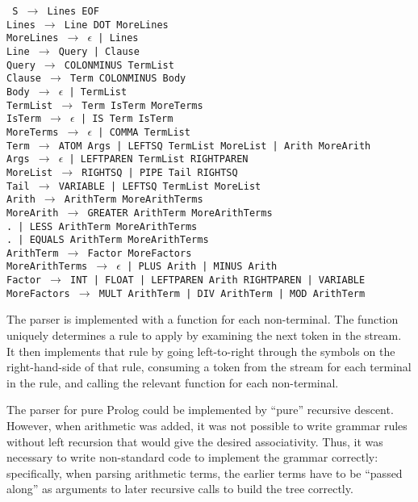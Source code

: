 \documentclass[12pt]{article}
\begin{document}
\texttt{
S $\rightarrow$ Lines EOF\\
Lines $\rightarrow$ Line DOT MoreLines\\
MoreLines $\rightarrow$ $\epsilon$ | Lines\\
Line $\rightarrow$ Query | Clause\\
Query $\rightarrow$ COLONMINUS TermList\\
Clause $\rightarrow$ Term COLONMINUS Body\\
Body $\rightarrow$ $\epsilon$ | TermList\\
TermList $\rightarrow$ Term IsTerm MoreTerms\\
IsTerm $\rightarrow$ $\epsilon$ | IS Term IsTerm\\
MoreTerms $\rightarrow$ $\epsilon$ | COMMA TermList\\
Term $\rightarrow$ ATOM Args | LEFTSQ TermList MoreList | Arith MoreArith\\
Args $\rightarrow$ $\epsilon$ | LEFTPAREN TermList RIGHTPAREN\\
MoreList $\rightarrow$ RIGHTSQ | PIPE Tail RIGHTSQ\\
Tail $\rightarrow$ VARIABLE | LEFTSQ TermList MoreList\\
Arith $\rightarrow$ ArithTerm MoreArithTerms\\
MoreArith $\rightarrow$ GREATER ArithTerm MoreArithTerms\\
.\hspace{50px} | LESS ArithTerm MoreArithTerms \\
.\hspace{50px} | EQUALS ArithTerm MoreArithTerms\\
ArithTerm $\rightarrow$ Factor MoreFactors\\
MoreArithTerms $\rightarrow$ $\epsilon$ | PLUS Arith | MINUS Arith\\
Factor $\rightarrow$ INT | FLOAT | LEFTPAREN Arith RIGHTPAREN | VARIABLE\\
MoreFactors $\rightarrow$ MULT ArithTerm | DIV ArithTerm | MOD ArithTerm
}

The parser is implemented with a function for each non-terminal. 
The function uniquely determines a rule to apply by examining the next token in the stream. 
It then implements that rule by going left-to-right through the symbols on the right-hand-side of that rule, consuming a token from the stream for each terminal in the rule, and calling the relevant function for each non-terminal.

The parser for pure Prolog could be implemented by ``pure'' recursive descent. 
However, when arithmetic was added, it was not possible to write grammar rules without left recursion that would give the desired associativity. 
Thus, it was necessary to write non-standard code to implement the grammar correctly: specifically, when parsing arithmetic terms, the earlier terms have to be ``passed along'' as arguments to later recursive calls to build the tree correctly.
\end{document}
